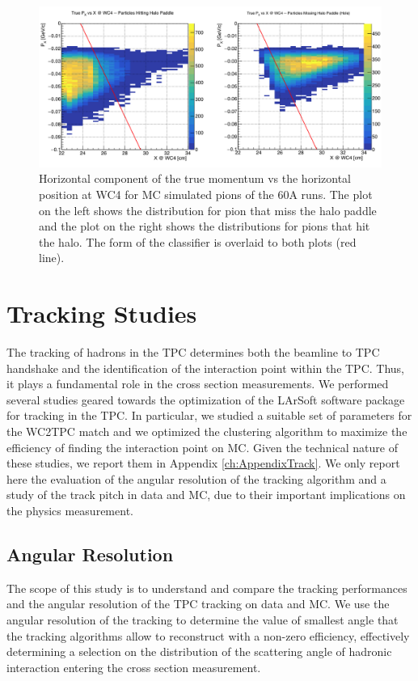 \begin{figure}[hbpt]
\centering
\includegraphics[width=\textwidth]{Chapter-5/Images/PXVsX60A.png}
\caption{Horizontal component of the true momentum vs the horizontal position at WC4 for MC simulated pions of the 60A runs. The plot on the left shows the distribution for pion that miss the halo paddle and the plot on the right shows the distributions for pions that hit the halo. The form of the classifier is overlaid to both plots (red line).}
\label{fig:PxVsXTrue}
\end{figure}

\section{Tracking Studies}\label{sec:TrackingStudies}
The tracking of hadrons in the TPC determines both the beamline to TPC handshake and the identification of the interaction point within the TPC. Thus, it plays a fundamental role in the cross section measurements. We performed several studies geared towards the optimization of the LArSoft software package for tracking in the TPC. In particular, we studied a suitable set of parameters for the WC2TPC match and we optimized the clustering algorithm to maximize the efficiency of finding the interaction point on MC. Given the technical nature of these studies, we report them in Appendix \ref{ch:AppendixTrack}. 
We only report here the evaluation of  the angular resolution of the tracking algorithm and a study of the track pitch in data and MC, due to their important implications on the physics measurement.


\subsection{Angular Resolution}\label{sec:angleRes}
The scope of this study is to understand and compare the tracking performances and the angular resolution of the TPC tracking on data and MC. 
We use the angular resolution of the tracking to determine  the value of smallest angle that the tracking algorithms allow to reconstruct with a non-zero efficiency, effectively determining a selection on the distribution of the scattering angle of hadronic interaction entering the cross section measurement. %

